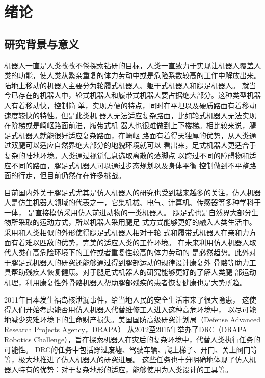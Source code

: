 \newcommand{\aref}[1]{\autoref{#1}\space}
\newcommand{\eref}[1]{式\eqref{#1}}
\renewcommand{\algorithmcfname}{算法}
\chapter{绪论}
\section{研究背景与意义}
机器人一直是人类孜孜不倦探索钻研的目标，人类一直致力于实现让机器人覆盖人
类的功能，使人类从繁杂重复的体力劳动中或是危险系数较高的工作中解放出来。
陆地上移动的机器人主要分为轮履式机器人、躯干式机器人和腿足机器人。
就当今已存在的机器人中，轮式机器人和履带式机器人要占据绝大部分。这种类型机器人有着移动快，控制简
单，实现方便的特点，同时在平坦以及硬质路面有着移动速度较快的特性。但是此类机
器人无法适应复杂路面，比如轮式机器人无法实现在阶梯或是崎岖路面前进，履带式机
器人也很难做到上下楼梯。相比较来说，腿足式机器人就能很好适应复杂路面，在崎岖
路面有着得天独厚的优势，从人类通过双腿可以适应自然界绝大部分的地貌环境就可以
看出来，足式机器人更适合于复杂的陆地环境\cite{Schraft2000ServiceR}。人类通过视觉信息选取离散的落脚点
以跨过不同的障碍物和适应不同的路面，腿足式机器人可以通过步态规划以及身体平衡
控制做到不平整路面的行走，但目前仍然存在许多挑战。

目前国内外关于腿足式尤其是仿人机器人的研究也受到越来越多的关注，仿人机器
人是仿生机器人领域的代表之一，它集机械、电气、计算机、传感器等多种学科于一体，
是直接模仿采用仿人前进动物的一类机器人\cite{梶田秀司2007仿人机器人}。
腿足式也是自然界大部分生物所采取的运动方式，所以机器人采用腿足
式方式能够更好的融入人类生活中。采用和人类相似的外形使得腿足式机器人相对于轮
式和履带式机器人在亲和力方面有着难以匹敌的优势，完美的适应人类的工作环境\cite{2010067776.nh}。
在未来利用仿人机器人取代人类在高危险环境下的工作或者重复性较高的体力劳动的
是必然趋势。此外对于腿足式机器人的研究还能够通过得到腿部运动的规律设计康复外
骨骼等助力工具帮助残疾人恢复健康。对于腿足式机器人的研究能够更好的了解人类腿
部运动机理，利用康复性外骨骼机器人帮助腿部残疾的患者恢复健康也是大势所趋。

2011年日本发生福岛核泄漏事件，给当地人民的安全生活带来了很大隐患，
这使得人们开始考虑能否用仿人机器人代替维修工人进入这种高危环境中，
以尽可能地减少灾难环境下的生命财产损失。美国国防高级研究计划局（Defense Advanced Research Projects Agency，DRAPA）
从2012至2015年举办了DRC（DRAPA Robotics Challenge），旨在探索机器人在灾后的复杂环境中，代替人类执行任务的可能性。
DRC的任务中包括穿过废墟、驾驶车辆、爬上梯子、开门、关上阀门等等，极大地推进了仿人机器人的研究进展。
这些任务也十分明确地体现了仿人机器人特有的优势：对于复杂地形的适应，能够使用为人类设计的工具等。

